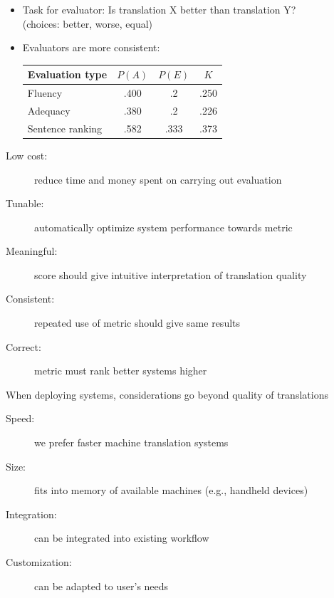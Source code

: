 \documentclass[landscape]{slides}
\begin{document}

\vspace{20mm}
\begin{itemize}
\item Task for evaluator: Is translation X better than translation Y?\\
(choices: better, worse, equal)
\vspace{5mm}
\item Evaluators are more consistent:

\begin{center}
\begin{tabular}{lccc}
Evaluation type & $P(A)$ & $P(E)$ & $K$ \\
\hline
Fluency & .400 & .2 & .250\\
Adequacy & .380 &  .2 & .226\\
Sentence ranking & .582 & .333 & .373\\
\hline
\end{tabular}
\end{center}

\end{itemize}


\vspace{25mm}
\begin{description}
\item[Low cost:] reduce time and money spent on carrying out evaluation
\item[Tunable:] automatically optimize system performance towards metric
\item[Meaningful:] score should give intuitive interpretation of translation quality
\item[Consistent:] repeated use of metric should give same results
\item[Correct:] metric must rank better systems higher
\end{description}


\vspace{27mm}
When deploying systems, considerations go beyond quality of translations
\vspace{5mm}
\begin{description}
\item[Speed:] we prefer faster machine translation systems
\item[Size:] fits into memory of available machines (e.g., handheld devices)
\item[Integration:] can be integrated into existing workflow
\item[Customization:] can be adapted to user's needs 
\end{description}
\end{document}
